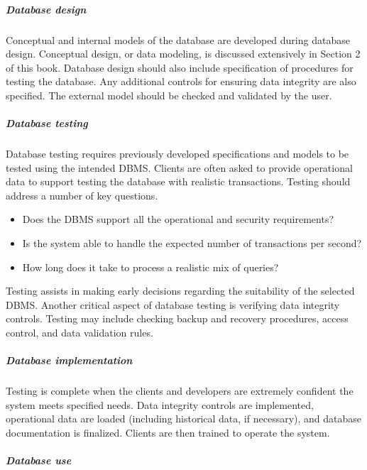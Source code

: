 \documentclass[
]{article}
\begin{document}
\hypertarget{database-design}{%
\subparagraph*{Database design}\label{database-design}}

Conceptual and internal models of the database are developed during
database design. Conceptual design, or data modeling, is discussed
extensively in Section 2 of this book. Database design should also
include specification of procedures for testing the database. Any
additional controls for ensuring data integrity are also specified. The
external model should be checked and validated by the user.

\hypertarget{database-testing}{%
\subparagraph*{Database testing}\label{database-testing}}

Database testing requires previously developed specifications and models
to be tested using the intended DBMS. Clients are often asked to provide
operational data to support testing the database with realistic
transactions. Testing should address a number of key questions.

\begin{itemize}
\item
  Does the DBMS support all the operational and security requirements?
\item
  Is the system able to handle the expected number of transactions per
  second?
\item
  How long does it take to process a realistic mix of queries?
\end{itemize}

Testing assists in making early decisions regarding the suitability of
the selected DBMS. Another critical aspect of database testing is
verifying data integrity controls. Testing may include checking backup
and recovery procedures, access control, and data validation rules.

\hypertarget{database-implementation}{%
\subparagraph*{Database implementation}\label{database-implementation}}

Testing is complete when the clients and developers are extremely
confident the system meets specified needs. Data integrity controls are
implemented, operational data are loaded (including historical data, if
necessary), and database documentation is finalized. Clients are then
trained to operate the system.

\hypertarget{database-use}{%
\subparagraph*{Database use}\label{database-use}}
\end{document}
